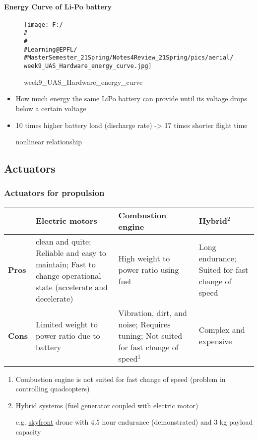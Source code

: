 \documentclass[]{article}
\let\oldparagraph\paragraph
\renewcommand{\paragraph}[1]{\oldparagraph{#1}\mbox{}}
\begin{document}
\paragraph{Energy Curve of Li-Po battery}\label{header-n2008}

\begin{figure}
\centering
\texttt{[image: F:/\\\#\\\#\\\#Learning@EPFL/\\\#MasterSemester\_21Spring/Notes4Review\_21Spring/pics/aerial/week9\_UAS\_Hardware\_energy\_curve.jpg]}
\caption{week9\_UAS\_Hardware\_energy\_curve}
\end{figure}

\begin{itemize}
\item
  How much energy the same LiPo battery can provide until its voltage
  drops below a certain voltage
\item
  10 times higher battery load (discharge rate) -\textgreater{} 17 times
  shorter flight time

  nonlinear relationship
\end{itemize}

\subsection{Actuators}\label{header-n2016}

\subsubsection{Actuators for propulsion}\label{header-n2017}

\begin{longtable}[]{@{}llll@{}}
\toprule
& \textbf{Electric motors} & Combustion engine &
Hybrid\(^2\)\tabularnewline
\midrule
\endhead
\textbf{Pros} & clean and quite; Reliable and easy to maintain; Fast to
change operational state (accelerate and decelerate) & High weight to
power ratio using fuel & Long endurance; Suited for fast change of
speed\tabularnewline
\textbf{Cons} & Limited weight to power ratio due to battery &
Vibration, dirt, and noise; Requires tuning; Not suited for fast change
of speed\(^1\) & Complex and expensive\tabularnewline
\bottomrule
\end{longtable}

\begin{enumerate}
\def\labelenumi{\arabic{enumi}.}
\item
  Combustion engine is not suited for fast change of speed (problem in
  controlling quadcopters)
\item
  Hybrid systems (fuel generator coupled with electric motor)

  e.g. \href{https://skyfront.com/product-list}{skyfront} drone with 4.5
  hour endurance (demonstrated) and 3 kg payload capacity
\end{enumerate}
\end{document}
